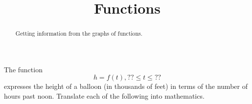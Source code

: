 \documentclass{ximera}
\title{Functions}
\begin{document}
\begin{abstract}
Getting information from the graphs of functions.
\end{abstract}
\maketitle

The function
\[
   h = f(t) , ?? \leq t \leq ??
\]
expresses the height of a balloon (in thousands of feet) in terms of the number of hours past noon. Translate each of the following into mathematics.
\end{document}

